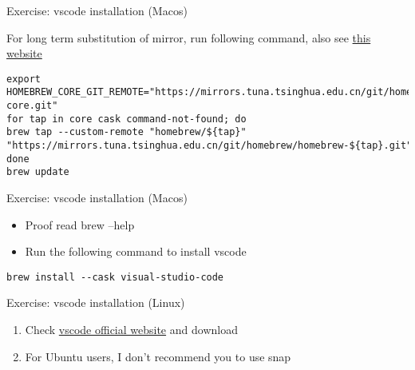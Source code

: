\begin{frame}[fragile]{Exercise: vscode installation (Macos)}

For long term substitution of mirror, run following command, also see \href{https://mirrors.tuna.tsinghua.edu.cn/help/homebrew-bottles/}{this website}

	\begin{verbatim}
export HOMEBREW_CORE_GIT_REMOTE="https://mirrors.tuna.tsinghua.edu.cn/git/homebrew/homebrew-core.git"
for tap in core cask command-not-found; do
brew tap --custom-remote "homebrew/${tap}" "https://mirrors.tuna.tsinghua.edu.cn/git/homebrew/homebrew-${tap}.git"
done
brew update
	\end{verbatim}
\end{frame}

\begin{frame}[fragile]{Exercise: vscode installation (Macos)}
\begin{itemize}
	\item Proof read brew --help
	\item Run the following command to install vscode
\end{itemize}

	\begin{verbatim}
brew install --cask visual-studio-code
	\end{verbatim}

\end{frame}

\begin{frame}[fragile]{Exercise: vscode installation (Linux)}
	\begin{enumerate}
		\item Check \href{https://code.visualstudio.com/docs/setup/linux}{vscode official website} and download
		\item For Ubuntu users, I don't recommend you to use snap
	\end{enumerate}
\end{frame}
